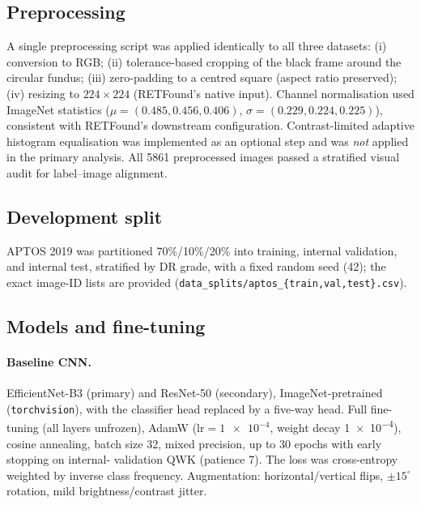 \documentclass[11pt,a4paper]{article}
\begin{document}
\subsection{Preprocessing}

A single preprocessing script was applied identically to all three datasets:
(i) conversion to RGB; (ii) tolerance-based cropping of the black frame around
the circular fundus; (iii) zero-padding to a centred square (aspect ratio
preserved); (iv) resizing to $224\times224$ (RETFound's native input). Channel
normalisation used ImageNet statistics ($\mu=(0.485,0.456,0.406)$,
$\sigma=(0.229,0.224,0.225)$), consistent with RETFound's downstream
configuration. Contrast-limited adaptive histogram equalisation was implemented
as an optional step and was \emph{not} applied in the primary analysis. All
\num{5861} preprocessed images passed a stratified visual audit for
label--image alignment.

\subsection{Development split}

APTOS 2019 was partitioned 70\%/10\%/20\% into training, internal validation,
and internal test, stratified by DR grade, with a fixed random seed (42); the
exact image-ID lists are provided
(\texttt{data\_splits/aptos\_\{train,val,test\}.csv}).

\subsection{Models and fine-tuning}

\paragraph{Baseline CNN.} EfficientNet-B3 \citep{tan2019efficientnet} (primary)
and ResNet-50 \citep{he2016resnet} (secondary), ImageNet-pretrained
(\texttt{torchvision}), with the classifier head replaced by a five-way head. Full fine-tuning (all layers unfrozen), AdamW
($\text{lr}=\num{1e-4}$, weight decay \num{1e-4}), cosine annealing, batch
size 32, mixed precision, up to 30 epochs with early stopping on internal-
validation QWK (patience 7). The loss was cross-entropy weighted by inverse
class frequency. Augmentation: horizontal/vertical flips, $\pm15^\circ$
rotation, mild brightness/contrast jitter.
\end{document}
